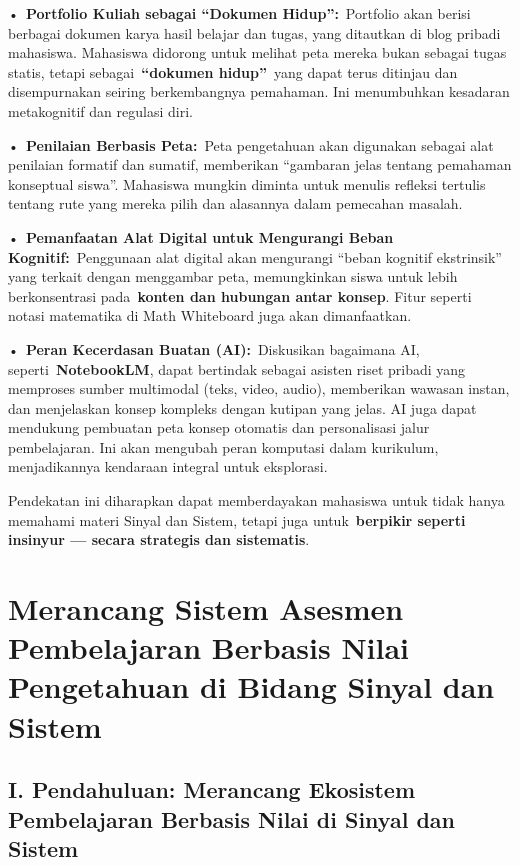 \documentclass[
  letterpaper,
  DIV=11,
  numbers=noendperiod]{scrreprt}
\begin{document}
•~\textbf{Portfolio Kuliah sebagai ``Dokumen Hidup'':}~Portfolio akan
berisi berbagai dokumen karya hasil belajar dan tugas, yang ditautkan di
blog pribadi mahasiswa. Mahasiswa didorong untuk melihat peta mereka
bukan sebagai tugas statis, tetapi sebagai~\textbf{``dokumen
hidup''}~yang dapat terus ditinjau dan disempurnakan seiring
berkembangnya pemahaman. Ini menumbuhkan kesadaran metakognitif dan
regulasi diri.

•~\textbf{Penilaian Berbasis Peta:}~Peta pengetahuan akan digunakan
sebagai alat penilaian formatif dan sumatif, memberikan ``gambaran jelas
tentang pemahaman konseptual siswa''. Mahasiswa mungkin diminta untuk
menulis refleksi tertulis tentang rute yang mereka pilih dan alasannya
dalam pemecahan masalah.

•~\textbf{Pemanfaatan Alat Digital untuk Mengurangi Beban
Kognitif:}~Penggunaan alat digital akan mengurangi ``beban kognitif
ekstrinsik'' yang terkait dengan menggambar peta, memungkinkan siswa
untuk lebih berkonsentrasi pada~\textbf{konten dan hubungan antar
konsep}. Fitur seperti notasi matematika di Math Whiteboard juga akan
dimanfaatkan.

•~\textbf{Peran Kecerdasan Buatan (AI):}~Diskusikan bagaimana AI,
seperti~\textbf{NotebookLM}, dapat bertindak sebagai asisten riset
pribadi yang memproses sumber multimodal (teks, video, audio),
memberikan wawasan instan, dan menjelaskan konsep kompleks dengan
kutipan yang jelas. AI juga dapat mendukung pembuatan peta konsep
otomatis dan personalisasi jalur pembelajaran. Ini akan mengubah peran
komputasi dalam kurikulum, menjadikannya kendaraan integral untuk
eksplorasi.

Pendekatan ini diharapkan dapat memberdayakan mahasiswa untuk tidak
hanya memahami materi Sinyal dan Sistem, tetapi juga
untuk~\textbf{berpikir seperti insinyur --- secara strategis dan
sistematis}.


\chapter{Merancang Sistem Asesmen Pembelajaran Berbasis Nilai
Pengetahuan di Bidang Sinyal dan
Sistem}\label{merancang-sistem-asesmen-pembelajaran-berbasis-nilai-pengetahuan-di-bidang-sinyal-dan-sistem}

\section{I. Pendahuluan: Merancang Ekosistem Pembelajaran Berbasis Nilai
di Sinyal dan
Sistem}\label{i.-pendahuluan-merancang-ekosistem-pembelajaran-berbasis-nilai-di-sinyal-dan-sistem}
\end{document}

